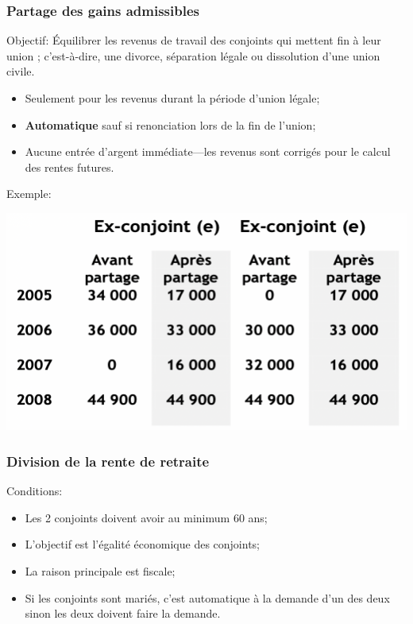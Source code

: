 \documentclass[10pt, french]{article}
\begin{document}
\begin{multicols*}{3}
\subsubsection*{Partage des gains admissibles}
Objectif: Équilibrer les revenus de travail des conjoints qui \og mettent fin à leur union \fg{}; c'est-à-dire, une divorce, séparation légale ou dissolution d'une union civile.
\begin{itemize}
	\item	Seulement pour les revenus durant la période d'union légale;
	\item	\textbf{Automatique} sauf si renonciation lors de la fin de l'union;
	\item	Aucune entrée d'argent immédiate---les revenus sont corrigés pour le calcul des rentes futures.
\end{itemize}

Exemple:
\begin{center}
	\includegraphics[scale=0.4]{src/ACT-1005/exemple-DIVORCE.png}
\end{center}


\subsubsection*{Division de la rente de retraite}
Conditions:
\begin{itemize}[leftmargin = *]
	\item	Les 2 conjoints doivent avoir au minimum 60 ans;
	\item	L'objectif est l'égalité économique des conjoints;
	\item	La raison principale est fiscale;
	\item	Si les conjoints sont mariés, c'est automatique à la demande d'un des deux sinon les deux doivent faire la demande.
\end{itemize}



\end{multicols*}
\end{document}
